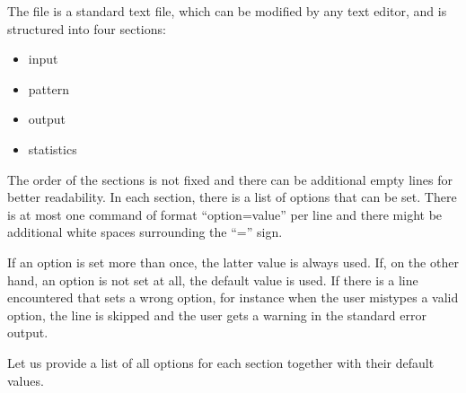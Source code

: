 The file is a standard text file, which can be modified by any text editor, and is structured into four sections:
\begin{itemize}
\item input
\item pattern
\item output
\item statistics
\end{itemize}
The order of the sections is not fixed and there can be additional empty lines for better readability. In each section, there is a list of options that can be set. There is at most one command of format ``option=value'' per line and there might be additional white spaces surrounding the ``='' sign.

If an option is set more than once, the latter value is always used. If, on the other hand, an option is not set at all, the default value is used. If there is a line encountered that sets a wrong option, for instance when the user mistypes a valid option, the line is skipped and the user gets a warning in the standard error output.

Let us provide a list of all options for each section together with their default values.


